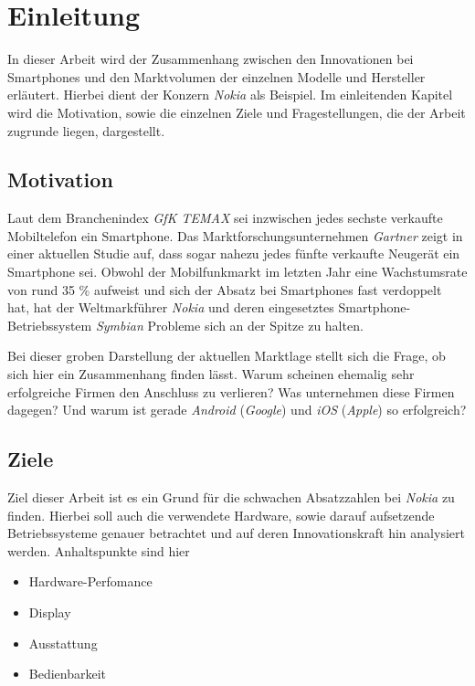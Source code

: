 \section{Einleitung}
In dieser Arbeit wird der Zusammenhang zwischen den Innovationen bei Smartphones und den Marktvolumen der einzelnen Modelle und Hersteller erläutert. Hierbei dient der Konzern \emph{Nokia} als Beispiel. Im einleitenden Kapitel wird die Motivation, sowie die einzelnen Ziele und Fragestellungen, die der Arbeit zugrunde liegen, dargestellt.

\subsection{Motivation}

Laut dem Branchenindex \emph{GfK TEMAX} sei inzwischen jedes sechste verkaufte Mobiltelefon ein Smartphone. Das Marktforschungsunternehmen \emph{Gartner} zeigt in einer aktuellen Studie auf, dass sogar nahezu jedes fünfte verkaufte Neugerät ein Smartphone sei. Obwohl der Mobilfunkmarkt im letzten Jahr eine Wachstumsrate von rund 35 \% aufweist und sich der Absatz bei Smartphones fast verdoppelt hat, hat der Weltmarkführer \emph{Nokia} und deren eingesetztes Smartphone-Betriebssystem \emph{Symbian} Probleme sich an der Spitze zu halten.

Bei dieser groben Darstellung der aktuellen Marktlage stellt sich die Frage, ob sich hier ein Zusammenhang finden lässt. Warum scheinen ehemalig sehr erfolgreiche Firmen den Anschluss zu verlieren? Was unternehmen diese Firmen dagegen? Und warum ist gerade \emph{Android} (\emph{Google}) und \emph{iOS} (\emph{Apple}) so erfolgreich?

\subsection{Ziele}

Ziel dieser Arbeit ist es ein Grund für die schwachen Absatzzahlen bei \emph{Nokia} zu finden. Hierbei soll auch die verwendete Hardware, sowie darauf aufsetzende Betriebssysteme genauer betrachtet und auf deren Innovationskraft hin analysiert werden. Anhaltspunkte sind hier
\begin{itemize}
	\item Hardware-Perfomance
	\item Display
	\item Ausstattung
	\item Bedienbarkeit
\end{itemize}
